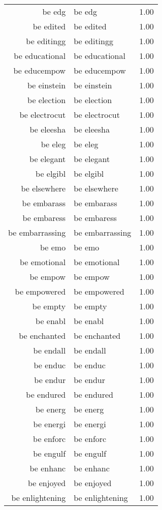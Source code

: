 \begin{table}[ht]
\begin{tabular}{rlr}
  be edg & be edg & 1.00 \\ 
  be edited & be edited & 1.00 \\ 
  be editingg & be editingg & 1.00 \\ 
  be educational & be educational & 1.00 \\ 
  be educempow & be educempow & 1.00 \\ 
  be einstein & be einstein & 1.00 \\ 
  be election & be election & 1.00 \\ 
  be electrocut & be electrocut & 1.00 \\ 
  be eleesha & be eleesha & 1.00 \\ 
  be eleg & be eleg & 1.00 \\ 
  be elegant & be elegant & 1.00 \\ 
  be elgibl & be elgibl & 1.00 \\ 
  be elsewhere & be elsewhere & 1.00 \\ 
  be embarass & be embarass & 1.00 \\ 
  be embaress & be embaress & 1.00 \\ 
  be embarrassing & be embarrassing & 1.00 \\ 
  be emo & be emo & 1.00 \\ 
  be emotional & be emotional & 1.00 \\ 
  be empow & be empow & 1.00 \\ 
  be empowered & be empowered & 1.00 \\ 
  be empty & be empty & 1.00 \\ 
  be enabl & be enabl & 1.00 \\ 
  be enchanted & be enchanted & 1.00 \\ 
  be endall & be endall & 1.00 \\ 
  be enduc & be enduc & 1.00 \\ 
  be endur & be endur & 1.00 \\ 
  be endured & be endured & 1.00 \\ 
  be energ & be energ & 1.00 \\ 
  be energi & be energi & 1.00 \\ 
  be enforc & be enforc & 1.00 \\ 
  be engulf & be engulf & 1.00 \\ 
  be enhanc & be enhanc & 1.00 \\ 
  be enjoyed & be enjoyed & 1.00 \\ 
  be enlightening & be enlightening & 1.00 \\ 

\end{tabular}
\end{table}
